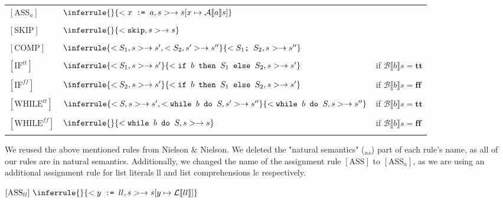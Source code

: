 \documentclass[12pt]{article}
\newcommand\mono\texttt
\newcommand{\metavar}[1]{\textlangle#1\textrangle}
\newcommand{\dblbr}[1]{\llbracket#1\rrbracket}
\newcommand{\fancybr}[2]{#1 \dblbr{#2}}
\renewcommand{\AA}{\mathcal{A}}
\newcommand{\Ntwo}{Nielson \& Nielson}
\newcommand{\BB}{\mathcal{B}}
\newcommand{\LL}{\mathcal{L}}
\begin{document}
\begin{center}
\begin{tabular}{lll}
    $[\text{ASS}_a]$ & $\inferrule
        {}
        {<x \mono{ := } a, s> \rightarrow s[x \mapsto \fancybr{\AA}{a}s]}
    $\\\\
    $[\text{SKIP}]$ & $\inferrule
        {}
        {<\mono{skip}, s> \rightarrow s}
    $\\\\
    $[\text{COMP}]$ & $\inferrule
        {<S_1, s> \rightarrow s', <S_2, s'> \rightarrow s''}
        {<S_1 \mono{; } S_2, s> \rightarrow s''}
    $\\\\
    $[\text{IF}^{tt}]$ & $\inferrule
        {<S_1, s> \rightarrow s'}
        {<\mono{if } b \mono{ then } S_1 \mono{ else } S_2, s> \rightarrow s'}
    $ & if $\fancybr{\BB}{b}s = \mathbf{tt}$\\\\
    $[\text{IF}^{ff}]$ & $\inferrule
        {<S_2, s> \rightarrow s'}
        {<\mono{if } b \mono{ then } S_1 \mono{ else } S_2, s> \rightarrow s'}
    $ & if $\fancybr{\BB}{b}s = \mathbf{ff}$\\\\
    $[\text{WHILE}^{tt}]$ & $\inferrule
        {<S, s> \rightarrow s', <\mono{while } b \mono{ do } S, s'> \rightarrow s''}
        {<\mono{while } b \mono{ do } S, s> \rightarrow s''}
    $ & if $\fancybr{\BB}{b}s = \mathbf{tt}$\\\\
    $[\text{WHILE}^{ff}]$ & $\inferrule
        {}
        {<\mono{while } b \mono{ do } S, s> \rightarrow s}
    $ & if $\fancybr{\BB}{b}s = \mathbf{ff}$\\\\
\end{tabular}
\end{center}

We reused the above mentioned rules from \Ntwo \cite[Table 2.1]{wiley}.
We deleted the "natural semantics" ($_{ns}$) part of each rule's name, as all of our rules are in natural semantics. Additionally, we changed the name of the assignment rule $[\text{ASS}]$ to $[\text{ASS}_a]$, as we are using an additional assignment rule for list literals \metavar{ll} and list comprehensions \metavar{lc} respectively.

\begin{center}
    $[\text{ASS}_{ll}]\ \inferrule
        {}
        {<y \mono{ := } ll, s> \rightarrow s[y \mapsto \fancybr{\LL}{ll}]}$
\end{center}
\end{document}
